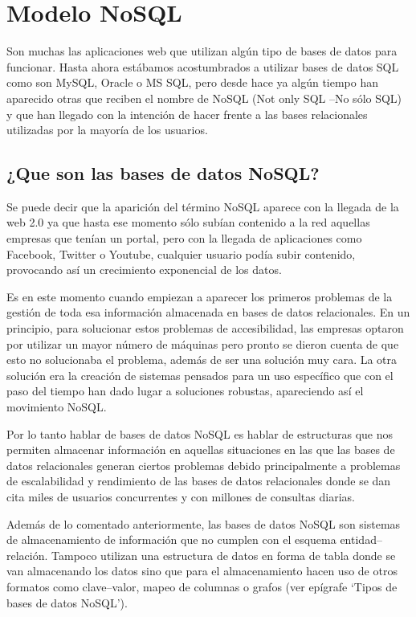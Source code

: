 \documentclass[12pts, A3 ,twosides]{article}
\begin{document}
\section{Modelo NoSQL}
Son  muchas  las  aplicaciones  web  que  utilizan  algún  tipo  de  bases  de  datos  para  funcionar.  Hasta  ahora estábamos  acostumbrados  a  utilizar  bases  de  datos  SQL  como  son  MySQL,  Oracle  o  MS  SQL,  pero  desde hace ya algún tiempo han aparecido otras que reciben el nombre de NoSQL (Not only SQL –No sólo SQL) y que  han  llegado  con  la intención  de  hacer  frente  a  las  bases  relacionales  utilizadas  por  la  mayoría  de  los usuarios.
\subsection{¿Que son las bases de datos NoSQL?}
Se puede decir que la aparición del término NoSQL aparece con la llegada de la web 2.0 ya que hasta ese momento  sólo  subían  contenido  a  la  red  aquellas  empresas  que  tenían  un  portal,  pero  con  la  llegada  de aplicaciones  como Facebook,  Twitter  o  Youtube,  cualquier  usuario  podía  subir  contenido,  provocando  así un crecimiento exponencial de los datos.

Es  en  este  momento  cuando  empiezan  a  aparecer  los  primeros  problemas  de  la  gestión  de  toda  esa información almacenada en bases  de  datos relacionales. En un principio, para solucionar estos problemas de  accesibilidad,  las  empresas  optaron  por  utilizar  un  mayor  número  de  máquinas  pero  pronto  se  dieron cuenta de que esto no solucionaba el problema, además de ser una solución muy cara. La otra solución era la  creación  de  sistemas  pensados  para  un  uso  específico  que  con  el  paso  del  tiempo  han  dado  lugar  a soluciones robustas, apareciendo así el movimiento NoSQL. 

Por  lo  tanto  hablar  de  bases  de  datos  NoSQL  es  hablar  de estructuras  que  nos  permiten  almacenar información  en  aquellas  situaciones  en  las  que  las  bases  de  datos  relacionales generan  ciertos  problemas debido  principalmente  a  problemas  de  escalabilidad  y  rendimiento  de  las  bases  de  datos  relacionales donde se dan cita miles de usuarios concurrentes y con millones de consultas diarias.

Además  de  lo  comentado  anteriormente,  las  bases  de  datos  NoSQL  son  sistemas  de  almacenamiento  de información  que  no cumplen  con  el esquema  entidad–relación.  Tampoco  utilizan  una  estructura  de  datos 
en  forma  de  tabla  donde  se  van  almacenando  los  datos  sino  que  para  el  almacenamiento  hacen  uso  de otros  formatos  como  clave–valor, mapeo de columnas o grafos (ver epígrafe ‘Tipos  de  bases  de  datos NoSQL’).
\end{document}
